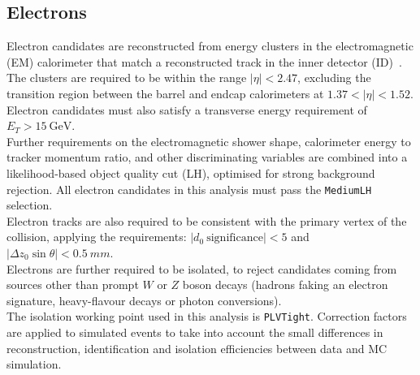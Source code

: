 \subsection{Electrons}
\label{sec:object:el}
Electron candidates are reconstructed from energy clusters in the
electromagnetic (EM) calorimeter that match a reconstructed track in
the inner detector (ID)~\cite{ATL-PHYS-PUB-2015-041,ATL-PHYS-PUB-2016-015,ATLAS-CONF-2016-024,PERF-2017-01}.
The clusters are required to be within the range $|\eta| < 2.47$,
excluding the transition region between the barrel and endcap calorimeters at 
$1.37 < |\eta| < 1.52$. 
Electron candidates must also satisfy a
transverse energy requirement of $E_{T} >\SI{15}{\GeV}$. \\
Further requirements on the electromagnetic shower shape, calorimeter
energy to tracker momentum ratio, and other discriminating variables
are combined into a likelihood-based object quality cut (LH), optimised for
strong background rejection. All electron candidates in this analysis
must pass the \texttt{MediumLH} selection.\\
Electron tracks are also required to be consistent with the primary vertex of the 
collision, applying the requirements: 
$|d_0~\mathrm{significance} | < 5$ and 
$|\Delta z_0 \sin\theta| < \SI{0.5}{mm}$. \\
Electrons are further required to be isolated, to reject
candidates coming from sources other than prompt $W$ or
$Z$ boson decays (hadrons faking an electron signature,
heavy-flavour decays or photon conversions). \\
The isolation working point used in this analysis is \texttt{PLVTight}. 
Correction factors are applied to simulated events to take into account the small differences in
reconstruction, identification and isolation efficiencies between data and MC simulation.

\FloatBarrier
